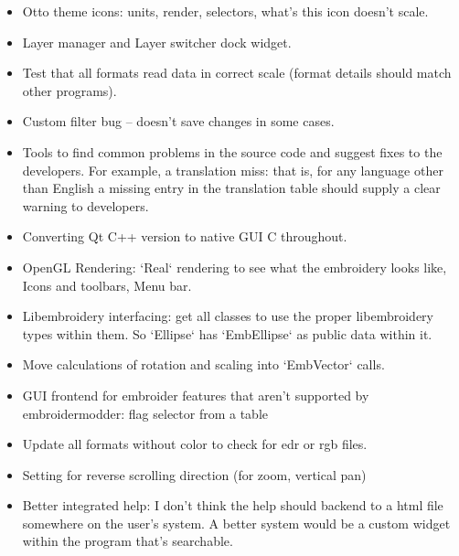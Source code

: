 \begin{itemize}
\item Otto theme icons: units, render, selectors, what's this icon doesn't scale.
\item Layer manager and Layer switcher dock widget.
\item Test that all formats read data in correct scale (format details should match other programs).
\item Custom filter bug -- doesn't save changes in some cases.
\item Tools to find common problems in the source code and suggest fixes to the developers. For example, a translation miss: that is, for any language other than English a missing entry in the translation table should supply a clear warning to developers.
\item Converting Qt C++ version to native GUI C throughout.
\item OpenGL Rendering: `Real` rendering to see what the embroidery looks like, Icons and toolbars, Menu bar.
\item Libembroidery interfacing: get all classes to use the proper libembroidery types within them. So `Ellipse` has `EmbEllipse` as public data within it.
\item Move calculations of rotation and scaling into `EmbVector` calls.
\item GUI frontend for embroider features that aren't supported by embroidermodder: flag selector from a table
\item Update all formats without color to check for edr or rgb files.
\item Setting for reverse scrolling direction (for zoom, vertical pan)
\item Better integrated help: I don't think the help should backend to a html file somewhere on the user's system. A better system would be a custom widget within the program that's searchable.
\end{itemize}

